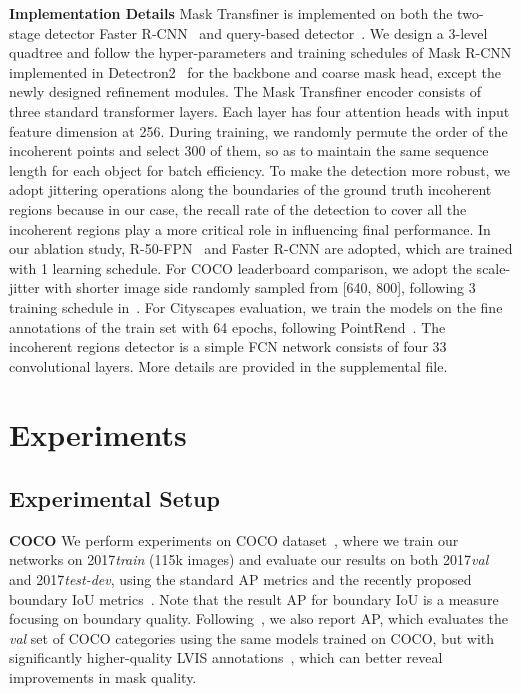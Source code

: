 \documentclass[10pt,twocolumn,letterpaper]{article}
\newcommand{\parsection}[1]{\vspace{1mm}\noindent\textbf{#1}}
\begin{document}
\parsection{Implementation Details}
Mask Transfiner is implemented on both the two-stage detector Faster R-CNN~\cite{ren2015faster} and query-based detector~\cite{carion2020end}. 
We design a 3-level quadtree and follow the hyper-parameters and training schedules of Mask R-CNN implemented in Detectron2~\cite{wu2019detectron2} for the backbone and coarse mask head, except the newly designed refinement modules.
The Mask Transfiner encoder consists of three standard transformer layers. Each layer has four attention heads with input feature dimension at 256.
During training, we randomly permute the order of the incoherent points and select 300 of them, so as to maintain the  same sequence length for each object for batch efficiency. 
To make the detection more robust, we adopt jittering operations along the boundaries of the ground truth incoherent regions because in our case, the recall rate of the detection to cover all the incoherent regions play a more critical role in influencing final performance.
In our ablation study, R-50-FPN~\cite{he2016deep} and Faster R-CNN are adopted, which are trained with 1 learning schedule.
For COCO leaderboard comparison, we adopt the scale-jitter with shorter image side randomly sampled from [640, 800], following 3 training schedule in~\cite{lee2019centermask,chen2019tensormask,ke2021bcnet}.
For Cityscapes evaluation, we train the models on the fine annotations of the train set with 64 epochs, following PointRend~\cite{kirillov2020pointrend}.
The incoherent regions detector is a simple FCN network consists of four 33 convolutional layers.
More details are provided in the supplemental file.


\section{Experiments}

\subsection{Experimental Setup}

\parsection{COCO}
We perform experiments on COCO dataset~\cite{lin2014microsoft}, where we train our networks on 2017{\it train} (115k images) and evaluate our results on both 2017{\it val} and 2017{\it test-dev}, using the standard AP metrics and the recently proposed boundary IoU metrics~\cite{cheng2021boundary}. Note that the result AP for boundary IoU is a measure focusing on boundary quality. Following~\cite{kirillov2020pointrend}, we also report AP, which evaluates the \textit{val} set of COCO categories using the same models trained on COCO, but with significantly higher-quality LVIS annotations~\cite{gupta2019lvis}, which can better reveal improvements in mask quality.
\end{document}
